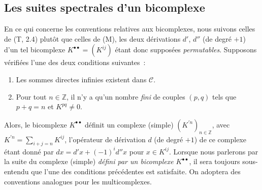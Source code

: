 \subsection{Les suites spectrales d'un bicomplexe}
\label{subsection:0.11.3-fr}

\begin{env}[11.3.1]
\label{0.11.3.1-fr}
En ce qui concerne les conventions relatives aux bicomplexes, nous suivons
celles de (T, 2.4) plutôt que celles de (M), les deux dérivations $d'$, $d''$
(de degré $+1$) d'un tel bicomplexe
$K^{\bullet\bullet}=(K^{ij})$ étant donc supposées \emph{permutables}.
Supposons vérifiées l'une des deux conditions suivantes~:
\begin{enumerate}
  \item[$1^\circ$] Les sommes directes infinies existent dans $\mathcal C$.
  \item[$2^\circ$] Pour tout $n\in\mathbb Z$, il n'y a qu'un nombre
    \emph{fini} de couples $(p,q)$ tels que $p+q=n$ et $K^{pq}\ne0$.
\end{enumerate}
Alors, le bicomplexe $K^{\bullet\bullet}$ définit un complexe (simple)
$(K^{\prime n})_{n\in\mathbb Z}$, avec
$K^{\prime n}=\sum_{i+j=n}K^{ij}$, l'opérateur de dérivation $d$ (de degré
$+1$) de ce complexe étant donné par
$dx=d'x+(-1)^i d''x$ pour $x\in K^{ij}$. Lorsque nous parlerons par la suite
du complexe (simple) \emph{défini par un bicomplexe $K^{\bullet\bullet}$}, il
sera toujours sous-entendu que l'une des conditions précédentes est satisfaite.
On adoptera des conventions analogues pour les multicomplexes.


\end{env}
